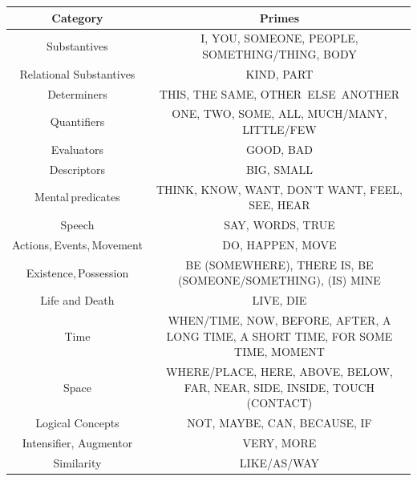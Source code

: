\begin{tabular}{|c|c|}
	\hline
\textbf{Category}& 
\textbf{Primes}\\ 
\hline

Substantives & 
	

I, YOU, SOMEONE, PEOPLE, SOMETHING/THING, BODY\\ 

Relational Substantives & 
	

KIND, PART\\ 

Determiners & 
	

THIS, THE SAME, OTHER~ELSE~ANOTHER\\ 

Quantifiers & 
	

ONE, TWO, SOME, ALL, MUCH/MANY, LITTLE/FEW\\ 

Evaluators & 
	

GOOD, BAD\\ 

Descriptors&  
	

BIG, SMALL\\ 

Mental predicates& 
	

THINK, KNOW, WANT, DON'T WANT, FEEL, SEE, HEAR\\ 

Speech& 
	

SAY, WORDS, TRUE\\ 

Actions, Events, Movement& 
	

DO, HAPPEN, MOVE\\ 

Existence, Possession& 
	

BE (SOMEWHERE), THERE IS, BE (SOMEONE/SOMETHING), (IS) MINE\\ 

Life and Death& 
	

LIVE, DIE \\

Time& 
	

WHEN/TIME, NOW, BEFORE, AFTER, A LONG TIME, A SHORT TIME, FOR SOME TIME, MOMENT\\ 

Space& 
	

WHERE/PLACE, HERE, ABOVE, BELOW, FAR, NEAR, SIDE, INSIDE, TOUCH (CONTACT)\\ 

Logical Concepts& 
	

NOT, MAYBE, CAN, BECAUSE, IF\\ 

Intensifier, Augmentor& 
	

VERY, MORE\\ 

Similarity& 
	

LIKE/AS/WAY\\ 
\hline

\end{tabular}


